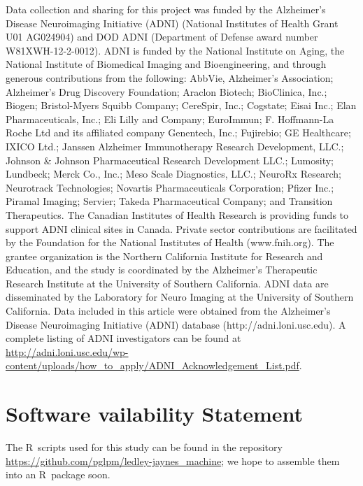 \documentclass[utf8]{FrontiersinHarvard} %
\providecommand{\href}[2]{#2}
\renewcommand*{\|}[1][]{\nonscript\:#1\vert\nonscript\:\mathopen{}}
\begin{document}
Data collection and sharing for this project was funded by the Alzheimer’s Disease Neuroimaging Initiative (ADNI) (National Institutes of Health Grant U01 AG024904) and DOD ADNI (Department of Defense award number W81XWH-12-2-0012). ADNI is funded by the National Institute on Aging, the National Institute of Biomedical Imaging and Bioengineering, and through generous contributions from the following: AbbVie, Alzheimer’s Association; Alzheimer’s Drug Discovery Foundation; Araclon Biotech; BioClinica, Inc.; Biogen; Bristol-Myers Squibb Company; CereSpir, Inc.; Cogstate; Eisai Inc.; Elan Pharmaceuticals, Inc.; Eli Lilly and Company; EuroImmun; F. Hoffmann-La Roche Ltd and its affiliated company Genentech, Inc.; Fujirebio; GE Healthcare; IXICO Ltd.; Janssen Alzheimer Immunotherapy Research Development, LLC.; Johnson \& Johnson Pharmaceutical Research Development LLC.; Lumosity; Lundbeck; Merck Co., Inc.; Meso Scale Diagnostics, LLC.; NeuroRx Research;
Neurotrack Technologies; Novartis Pharmaceuticals Corporation; Pfizer Inc.; Piramal Imaging; Servier; Takeda Pharmaceutical
Company; and Transition Therapeutics. The Canadian Institutes of Health Research is providing funds to support ADNI
clinical sites in Canada. Private sector contributions are facilitated by the Foundation for the National Institutes of Health
(www.fnih.org). The grantee organization is the Northern California Institute for Research and Education, and the study
is coordinated by the Alzheimer’s Therapeutic Research Institute at the University of Southern California. ADNI data are
disseminated by the Laboratory for Neuro Imaging at the University of Southern California. Data included in this article were
obtained from the Alzheimer’s Disease Neuroimaging Initiative (ADNI) database (http://adni.loni.usc.edu). A complete listing
of ADNI investigators can be found at \url{http://adni.loni.usc.edu/wp-content/uploads/how\_to\_apply/ADNI\_Acknowledgement\_List.pdf}.


\section*{Software vailability Statement}
The R~scripts used for this study can be found in the repository \url{https://github.com/pglpm/ledley-jaynes\_machine}; we hope to assemble them into an R~package soon.
\end{document}
